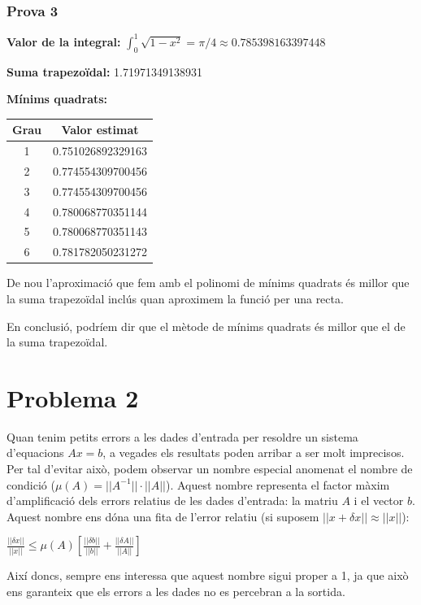 \documentclass[11pt,a4paper]{article}
\begin{document}
\subsubsection{Prova 3}

\textbf{Valor de la integral:} $\int_0^1 \sqrt{1-x^2} = \pi / 4 \approx 0.785398163397448$

\textbf{Suma trapezoïdal:} 1.71971349138931

\textbf{Mínims quadrats:}

\begin{tabular}{|c|c|}
\hline
\textbf{Grau} & \textbf{Valor estimat} \\
\hline
1 & 0.751026892329163 \\
\hline
2 & 0.774554309700456 \\
\hline
3 & 0.774554309700456 \\
\hline
4 & 0.780068770351144 \\
\hline
5 & 0.780068770351143 \\
\hline
6 & 0.781782050231272 \\
\hline
\end{tabular}

De nou l'aproximació que fem amb el polinomi de mínims quadrats és millor que la suma trapezoïdal inclús quan aproximem la funció per una recta.

En conclusió, podríem dir que el mètode de mínims quadrats és millor que el de la suma trapezoïdal.

\section{Problema 2}

Quan tenim petits errors a les dades d'entrada per resoldre un sistema d'equacions $Ax = b$, a vegades els resultats poden arribar a ser molt imprecisos. Per tal d'evitar això, podem observar un nombre especial anomenat el nombre de condició ($\mu(A) = ||A^{-1}||\cdot||A||$). Aquest nombre representa el factor màxim d'amplificació dels errors relatius de les dades d'entrada: la matriu $A$ i el vector $b$. Aquest nombre ens dóna una fita de l'error relatiu (si suposem $|| x + \delta x || \approx ||x||$):

$\frac{||\delta x||}{||x||} \leq \mu(A) [\frac{||\delta b||}{||b||} + \frac{||\delta A||}{||A||}]$

Així doncs, sempre ens interessa que aquest nombre sigui proper a 1, ja que això ens garanteix que els errors a les dades no es percebran a la sortida.
\end{document}
